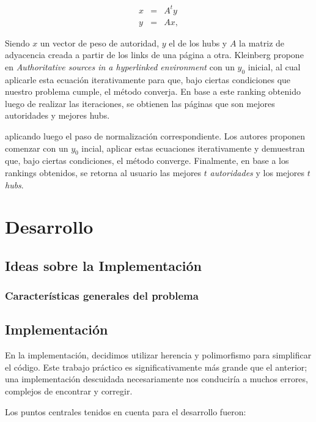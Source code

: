 \begin{eqnarray}
x & = & A^ty \label{eq:auth-update-math} \\
y & = & Ax, \label{eq:hub-update-math} 
\end{eqnarray}

Siendo $x$ un vector de peso de autoridad, $y$ el de los hubs y $A$ la matriz de adyacencia creada a partir de los links de una página a otra.
Kleinberg propone en \textit{Authoritative sources in a hyperlinked environment} con un $y_0$ inicial, al cual aplicarle esta ecuación iterativamente para que, bajo ciertas condiciones que nuestro problema cumple, el método converja. En base a este ranking obtenido luego de realizar las iteraciones, se obtienen las páginas que son mejores autoridades y mejores hubs.




aplicando luego el paso de normalizaci\'on correspondiente. Los autores proponen comenzar con un $y_0$ incial, aplicar estas ecuaciones 
iterativamente y demuestran que, bajo ciertas condiciones, el m\'etodo converge. Finalmente, en base a los rankings obtenidos, se retorna
al usuario las mejores $t$ \emph{autoridades} y los mejores $t$ \emph{hubs}.


\section{Desarrollo}
\subsection{Ideas sobre la Implementación}

\subsubsection{Características generales del problema}


\subsection{Implementación}

	En la implementación, decidimos utilizar herencia y polimorfismo para simplificar el código. Este trabajo práctico es significativamente más grande que el anterior; una implementación descuidada necesariamente nos conduciría a muchos errores, complejos de encontrar y corregir. 

	Los puntos centrales tenidos en cuenta para el desarrollo fueron:

